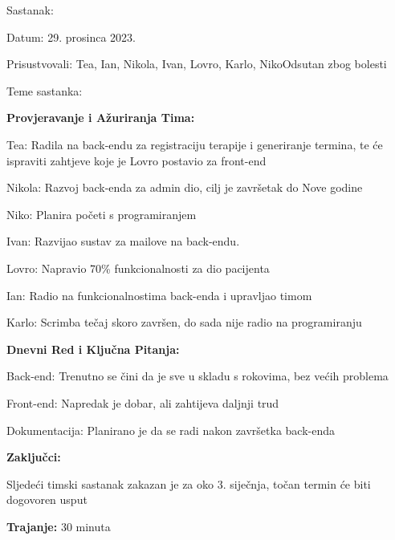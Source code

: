 \begin{packed_enum}
    \item Sastanak:
    \item[] \begin{packed_item}
        \item Datum: 29. prosinca 2023.
        \item Prisustvovali: Tea, Ian, Nikola, Ivan, Lovro, Karlo, NikoOdsutan zbog bolesti
        \item Teme sastanka:
            \begin{packed_item}
                \item \textbf{Provjeravanje i Ažuriranja Tima:}
                    \begin{packed_item}
                        \item Tea: Radila na back-endu za registraciju terapije i generiranje termina, te će ispraviti zahtjeve koje je Lovro postavio za front-end
                        \item Nikola: Razvoj back-enda za admin dio, cilj je završetak do Nove godine
                        \item Niko: Planira početi s programiranjem
                        \item Ivan: Razvijao sustav za mailove na back-endu.
                        \item Lovro: Napravio 70\% funkcionalnosti za dio pacijenta
                        \item Ian: Radio na funkcionalnostima back-enda i upravljao timom
                        \item Karlo: Scrimba tečaj skoro završen, do sada nije radio na programiranju
                    \end{packed_item}
                \item \textbf{Dnevni Red i Ključna Pitanja:}
                    \begin{packed_item}
                        \item Back-end: Trenutno se čini da je sve u skladu s rokovima, bez većih problema
                        \item Front-end: Napredak je dobar, ali zahtijeva daljnji trud
                        \item Dokumentacija: Planirano je da se radi nakon završetka back-enda
                    \end{packed_item}
                \item \textbf{Zaključci:}
                    \begin{packed_item}
                        \item Sljedeći timski sastanak zakazan je za oko 3. siječnja, točan termin će biti dogovoren usput
                    \end{packed_item}
                \item \textbf{Trajanje:} 30 minuta
            \end{packed_item}
    \end{packed_item}


\end{packed_enum}

